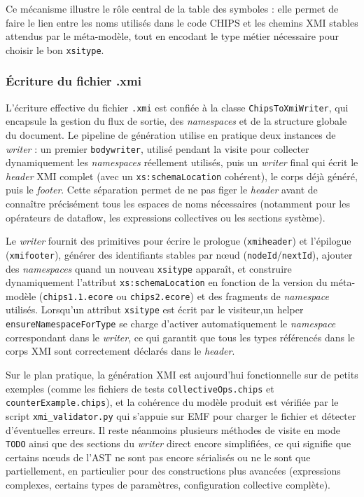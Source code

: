 \documentclass[a4paper, 11pt]{article}
\newcommand{\prog}[1]{\texttt{#1}}
\begin{document}
Ce mécanisme illustre le rôle central de la table des symboles : elle permet de faire le lien entre les noms utilisés dans le code CHIPS et les chemins XMI stables attendus par le méta-modèle, tout en encodant le type métier nécessaire pour choisir le bon \prog{xsitype}.

\subsubsection{Écriture du fichier .xmi}

L’écriture effective du fichier \prog{.xmi} est confiée à la classe \prog{ChipsToXmiWriter}, qui encapsule la gestion du flux de sortie, des \emph{namespaces} et de la structure globale du document. Le pipeline de génération utilise en pratique deux instances de \emph{writer} : un premier \prog{bodywriter}, utilisé pendant la visite pour collecter dynamiquement les \emph{namespaces} réellement utilisés, puis un \emph{writer} final qui écrit le \emph{header} XMI complet (avec un \prog{xs:schemaLocation} cohérent), le corps déjà généré, puis le \emph{footer}. Cette séparation permet de ne pas figer le \emph{header} avant de connaître précisément tous les espaces de noms nécessaires (notamment pour les opérateurs de dataflow, les expressions collectives ou les sections système).

Le \emph{writer} fournit des primitives pour écrire le prologue (\prog{xmiheader}) et l’épilogue (\prog{xmifooter}), générer des identifiants stables par nœud (\prog{nodeId}/\prog{nextId}), ajouter des \emph{namespaces} quand un nouveau \prog{xsitype} apparaît, et construire dynamiquement l’attribut \prog{xs:schemaLocation} en fonction de la version du méta-modèle (\prog{chips1.1.ecore} ou \prog{chips2.ecore}) et des fragments de \emph{namespace} utilisés. Lorsqu’un attribut \prog{xsitype} est écrit par le visiteur,\newline un helper \prog{ensureNamespaceForType} se charge d’activer automatiquement le \emph{namespace} correspondant dans le \emph{writer}, ce qui garantit que tous les types référencés dans le corps XMI sont correctement déclarés dans le \emph{header}.

Sur le plan pratique, la génération XMI est aujourd’hui fonctionnelle sur de petits exemples (comme les fichiers de tests \prog{collectiveOps.chips} et \prog{counterExample.chips}), et la cohérence du modèle produit est vérifiée par le script \prog{xmi\_validator.py} qui s’appuie sur EMF pour charger le fichier et détecter d’éventuelles erreurs. Il reste néanmoins plusieurs méthodes de visite en mode \prog{TODO} ainsi que des sections du \emph{writer} direct encore simplifiées, ce qui signifie que certains nœuds de l’AST ne sont pas encore sérialisés ou ne le sont que partiellement, en particulier pour des constructions plus avancées (expressions complexes, certains types de paramètres, configuration collective complète).
\end{document}
